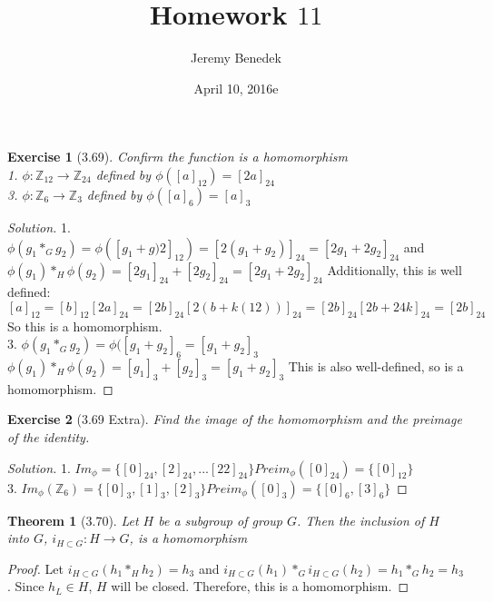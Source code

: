 \documentclass{article}
\title{Homework $11$}
\author{Jeremy Benedek}
\date{April 10, 2016e}
\newtheorem*{thm}{Theorem}
\newtheorem*{ex}{Exercise}
\newenvironment{solution}
  {\begin{proof}[Solution]}
  {\renewcommand{\qedsymbol}{}\end{proof}}
\begin{document}
\maketitle

\begin{ex}[3.69]
	Confirm the function is a homomorphism
	\\ 1. $\phi : \mathbb{Z}_{12} \rightarrow \mathbb{Z}_{24}$ defined by $\phi([a]_{12}) = [2a]_{24}$
	\\ 3. $\phi : \mathbb{Z}_{6} \rightarrow \mathbb{Z}_{3}$ defined by $\phi([a]_{6}) = [a]_{3}$
 
\end{ex}
\begin{solution}
	1. $\phi(g_1 *_G g_2) = \phi( [g_1 + g)2]_{12} ) = [2(g_1 + g_2)]_{24} = [2g_1 + 2g_2]_{24}$ and
	$\phi(g_1) *_H \phi(g_2) = [2g_1]_{24} + [2g_2]_{24} = [2g_1 + 2g_2]_{24}$
	Additionally, this is well defined: $[a]_{12} = [b]_{12} [2a]_{24} = [2b]_{24} [2(b+k(12))]_{24} = [2b]_{24} 
	[2b + 24k]_{24} = [2b]_{24}$ So this is a homomorphism.
	\\ 3.
	$\phi(g_1 *_G g_2) = \phi( [g_1 + g_2]_6 = [g_1 + g_2]_3$
	$\phi(g_1) *_H \phi(g_2) = [g_1]_3 + [g_2]_3 = [g_1 + g_2]_3$
	This is also well-defined, so is a homomorphism. 

\end{solution}

\begin{ex}[3.69 Extra]
	Find the image of the homomorphism and the preimage of the identity. 
\end{ex}
\begin{solution}
	1. $Im_{\phi} = \{ [0]_{24}, [2]_{24}, ... [22]_{24} \}
	Preim_{\phi}([0]_{24} ) = \{ [0]_{12} \}$
	\\ 3. $Im_{\phi}(\mathbb{Z}_6) = \{ [0]_3, [1]_3, [2]_3 \}
	Preim_{\phi}( [0]_3 ) = \{ [0]_6, [3]_6 \}$

\end{solution}

\begin{thm}[3.70]
	Let $H$ be a subgroup of group $G$. Then the inclusion of $H$ into $G$, $i_{H\subset G}:H \rightarrow G$, is a homomorphism
\end{thm}
\begin{proof}
	Let $i_{H\subset G}(h_1 *_H h_2) = h_3$ and $i_{H\subset G}(h_1) *_G i_{H\subset G}(h_2) = h_1 *_G h_2 = h_3$. Since $h_L \in H$, $H$ will
	be closed. Therefore, this is a homomorphism. 
\end{proof}
\end{document}
